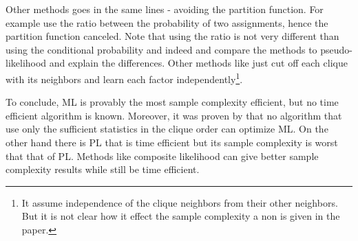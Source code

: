 Other methods goes in the same lines - avoiding the partition function. 
For example \cite{hyvarinen2007some} use the ratio between the probability of two assignments, hence the partition function canceled.
Note that using the ratio is not very different than using the conditional probability and indeed \cite{marlin2010inductive} and \cite{marlin2012asymptotic} compare the methods to pseudo-likelihood and explain the differences.
Other methods like \cite{mizrahi2014icml} just cut off each clique with its neighbors and learn each factor independently\footnote{It assume independence of the clique neighbors from their other neighbors. But it is not clear how it effect the sample complexity a non is given in the paper. }.

To conclude, ML is provably the most sample complexity efficient,   but no time efficient algorithm is known.
Moreover, it was proven by \cite{bresler2014hardness,montanari2015computational} that no algorithm that use only the sufficient statistics in the clique order can optimize ML.
On the other hand there is PL that is time efficient but its sample complexity is worst that that of PL.
Methods like composite likelihood can give better sample complexity results while still be time efficient.

  
